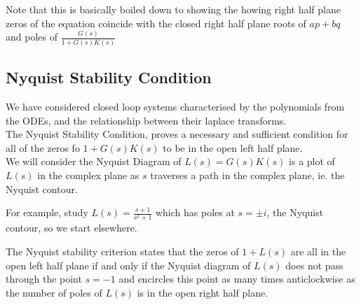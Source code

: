 Note that this is basically boiled down to showing the howing right half plane zeros of the equation coincide with the closed right half plane roots of $ap + bq$ and poles of $\frac{G(s)}{1 + G(s)K(s)}$

\subsection{Nyquist Stability Condition}
We have considered closed loop systems characterised by the polynomials from the ODEs, and the relationship between their laplace transforms. \\

The Nyquist Stability Condition, proves a necessary and sufficient condition for all of the zeros fo $1 + G(s)K(s)$ to be in the open left half plane. \\

We will consider the Nyquist Diagram of $L(s) = G(s)K(s)$ is a plot of $L(s)$ in the complex plane as $s$ traverses a path in the complex plane, ie. the Nyquist contour.

\begin{eg}
  For example, study $L(s) = \frac{s+1}{s^2 + 1}$ which has poles at $s = \pm i$, the Nyquist contour, so we start elsewhere.
\end{eg}

\begin{nlemma}
  The Nyquist stability criterion states that the zeros of $1 + L(s)$ are all in the open left half plane if and only if the Nyquist diagram of $L(s)$ does not pass through the point $s = -1$ and encircles this point as many times anticlockwise as the number of poles of $L(s)$ is in the open right half plane.
\end{nlemma}

